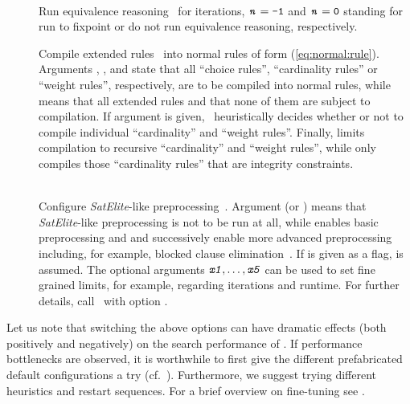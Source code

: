 \begin{description}
  \item[]~\\
    Run equivalence reasoning~\cite{gekanesc08a} for  iterations,
    $\texttt{\textit{n}}=\texttt{-1}$ and $\texttt{\textit{n}}=\texttt{0}$ standing for
    run to fixpoint or do not run equivalence reasoning, respectively.
  \item[]
    Compile extended rules~\cite{siniso02a} into normal rules of form (\ref{eq:normal:rule}).
    Arguments ,  , and 
    state that all ``choice rules'', ``cardinality rules'' or ``weight rules'', respectively,
    are to be compiled into normal rules,
    while  means that all extended rules and  that none of them
    are subject to compilation. If argument  is given,
    \clasp\ heuristically decides whether or not to compile individual
    ``cardinality'' and ``weight rules''.
    Finally,  limits compilation to recursive ``cardinality'' and ``weight rules'',
    while  only compiles those ``cardinality rules'' that are integrity constraints.
  \item[]~\\
    Configure \emph{SatElite}-like preprocessing~\cite{eenbie05a}.
    Argument  (or ) means that \emph{SatElite}-like preprocessing is not to be run at all,
    while  enables basic preprocessing and  and  successively enable more
    advanced preprocessing including, for example, blocked clause elimination~\cite{jabihe10a}.
    If  is given as a flag,  is assumed.
    The optional arguments $\texttt{\textit{x1}},\ldots,\texttt{\textit{x5}}$ can be used
    to set fine grained limits, for example, regarding iterations and runtime.
    For further details, call \clasp\ with option .

\end{description}
Let us note that switching the above options can have dramatic effects
(both positively and negatively) on the search performance of \clasp.
If performance bottlenecks are observed, it is worthwhile to first
give the different prefabricated default configurations a try (cf.\ ).
Furthermore, we suggest trying different heuristics and
restart sequences.
For a brief overview on fine-tuning see \cite{gekasc09b}.

